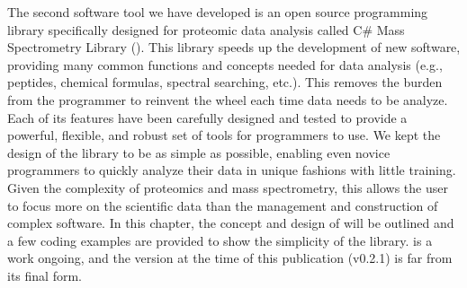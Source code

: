 The second software tool we have developed is an open source programming library specifically designed for proteomic data analysis called C\# Mass Spectrometry Library (\csmsl{}). This library speeds up the development of new software, providing many common functions and concepts needed for data analysis (e.g., peptides, chemical formulas, spectral searching, etc.). This removes the burden from the programmer to reinvent the wheel each time data needs to be analyze. Each of its features have been carefully designed and tested to provide a powerful, flexible, and robust set of tools for programmers to use. We kept the design of the library to be as simple as possible, enabling even novice programmers to quickly analyze their data in unique fashions with little training. Given the complexity of proteomics and mass spectrometry, this allows the user to focus more on the scientific data than the management and construction of complex software. In this chapter, the concept and design of \csmsl{} will be outlined and a few coding examples are provided to show the simplicity of the library. \csmsl{} is a work ongoing, and the version at the time of this publication (v0.2.1) is far from its final form. 

